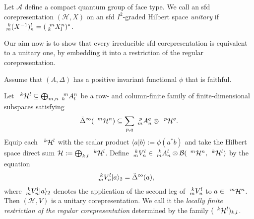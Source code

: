 
\begin{Def} Let $\mathscr{A}$ define a compact quantum group of face type. We call an sfd corepresentation $(\mathcal{H},X)$ on an sfd $I^2$-graded Hilbert space
\emph{unitary} if $\Gr{(X^{-1})}{k}{l}{m}{n}=(\Gr{X}{m}{n}{k}{l})^{*}$.  
\end{Def} 

Our aim now is to show that every irreducible sfd corepresentation is
equivalent to a unitary one, by embedding it into a restriction of the
regular corepresentation.

\begin{Exa} \label{exa:rep-regular}
  Assume that $(A,\Delta)$ has a positive invariant functional $\phi$
  that is faithful. 

  Let $\Gru{\mathcal{H}}{k}{l} \subseteq \bigoplus_{m,n}
  \Gr{A}{m}{n}{k}{l}$ be a row- and column-finite family of
  finite-dimensional subspaces satisfying
\begin{align*}
 \tilde  \Delta^{\co} (\Gru{\mathcal{H}}{m}{n}) \subseteq \sum_{p,q}
 \Gr{A}{p}{q}{m}{n} \otimes \Gru{\mathcal{H}}{p}{q}.
\end{align*}
Equip each $\Gru{\mathcal{H}}{k}{l}$ with the scalar product $\langle
a|b\rangle:=\phi(a^{*}b)$ and take the Hilbert space direct sum
$\mathcal{H}:=\bigoplus_{k,l} \Gru{\mathcal{H}}{k}{l}$.
Define $\Gr{V}{k}{l}{m}{n} \in \Gr{A}{k}{l}{m}{n} \otimes
\mathcal{B}(\Gru{\mathcal{H}}{m}{n},\Gru{\mathcal{H}}{k}{l})$ by the
equation
\begin{align*}
  \Gr{V}{k}{l}{m}{n}|a\rangle_{2} &= \tilde \Delta^{\co}(a),
\end{align*}
where $\Gr{V}{k}{l}{m}{n}|a\rangle_{2}$  denotes the application of
the second leg of
$\Gr{V}{k}{l}{m}{n}$  to $a \in \Gru{\mathcal{H}}{m}{n}$. Then
$(\mathcal{H},V)$ is a unitary corepresentation. We call it the 
\emph{locally finite restriction of the regular corepresentation}
determined by the family $(\Gru{\mathcal{H}}{k}{l})_{k,l}$. 
\end{Exa}

